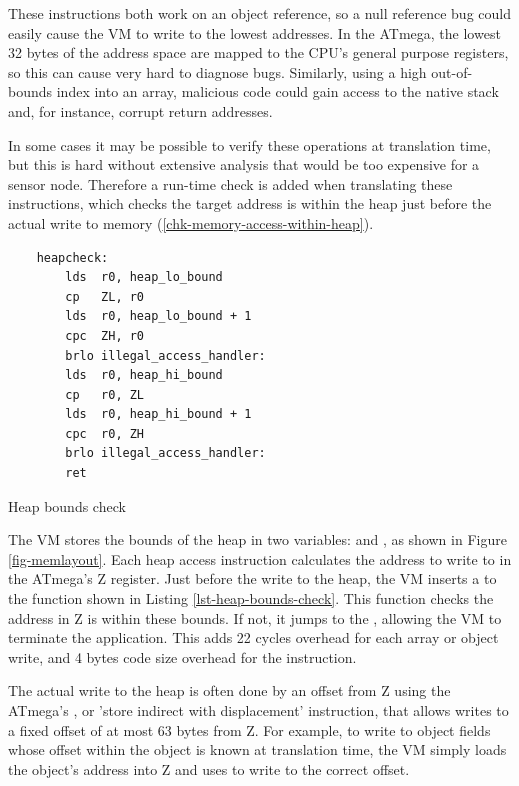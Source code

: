 These instructions both work on an object reference, so a null reference bug could easily cause the VM to write to the lowest addresses. In the ATmega, the lowest 32 bytes of the address space are mapped to the CPU's general purpose registers, so this can cause very hard to diagnose bugs. Similarly, using a high out-of-bounds index into an array, malicious code could gain access to the native stack and, for instance, corrupt return addresses.

In some cases it may be possible to verify these operations at translation time, but this is hard without extensive analysis that would be too expensive for a sensor node. Therefore a run-time check is added when translating these instructions, which checks the target address is within the heap just before the actual write to memory (\ref{chk-memory-access-within-heap}).

\begin{listing}
    \centering
    \begin{verbatim}
    heapcheck:
        lds  r0, heap_lo_bound
        cp   ZL, r0
        lds  r0, heap_lo_bound + 1
        cpc  ZH, r0
        brlo illegal_access_handler:
        lds  r0, heap_hi_bound
        cp   r0, ZL
        lds  r0, heap_hi_bound + 1
        cpc  r0, ZH
        brlo illegal_access_handler:
        ret
    \end{verbatim}
    \caption{Heap bounds check}
    \label{lst-heap-bounds-check}
\end{listing}

The VM stores the bounds of the heap in two variables:  and , as shown in Figure \ref{fig-memlayout}. Each heap access instruction calculates the address to write to in the ATmega's Z register. Just before the write to the heap, the VM inserts a  to the  function shown in Listing \ref{lst-heap-bounds-check}. This function checks the address in Z is within these bounds. If not, it jumps to the , allowing the VM to terminate the application. This adds 22 cycles overhead for each array or object write, and 4 bytes code size overhead for the  instruction.

The actual write to the heap is often done by an offset from Z using the ATmega's , or 'store indirect with displacement' instruction, that allows writes to a fixed offset of at most 63 bytes from Z. For example, to write to object fields whose offset within the object is known at translation time, the VM simply loads the object's address into Z and uses  to write to the correct offset.

